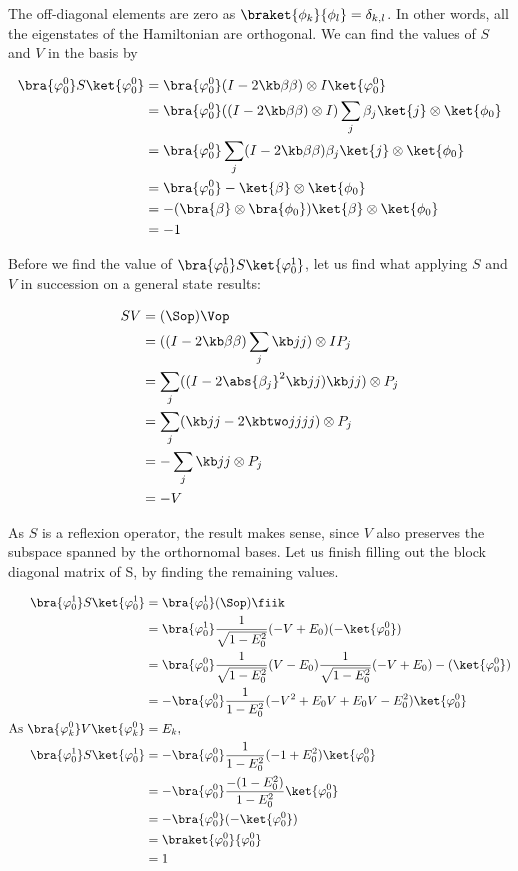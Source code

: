 The off-diagonal elements are zero as $ \braket{\phi_k}{\phi_l} = \delta_{k,l}$. In other words, all the eigenstates of the Hamiltonian are orthogonal. We can find the values of $S$ and  $V$ in the basis by

\begin{align*}
\bra{\varphi_0^0}S\ket{\varphi_0^0} &= \bra{\varphi_0^0} (I-2\kb \beta \beta) \otimes I \ket{\varphi_0^0}\\
&= \bra{\varphi^0_0} ((I-2\kb \beta \beta) \otimes I) \sum_j\beta_j\ket{j }\otimes \ket{\phi_0} \\
&= \bra{\varphi^0_0} \sum_j (I-2\kb \beta \beta) \beta_j\ket{j} \otimes \ket{\phi_0}\\
&= \bra{\varphi^0_0} - \ket{\beta} \otimes \ket{\phi_0}\\
&= - (\bra{\beta} \otimes \bra{\phi_0})  \ket{\beta} \otimes \ket{\phi_0}\\
&= -1
\end{align*}



Before we find the value of $\bra{\varphi_0^1}S\ket{\varphi_0^1}$, let us find what applying $S$ and $V$ in succession on a general state results:

\begin{align*}
SV&= (\Sop) \Vop\\
&= ((I - 2\kb \beta \beta)\sum_j \kb j j) \otimes I P_j\\
&= \sum_j ((I - 2 \abs{\beta_j}^2 \kb j j) \kb j j) \otimes P_j\\
&= \sum_j (\kb j j - 2 \kbtwo j j j j)\otimes P_j\\
&= - \sum_j \kb jj \otimes P_j\\
&= - V
\end{align*}

As $S$ is a reflexion operator, the result makes sense, since $V$ also preserves the subspace spanned by the orthornomal bases. Let us finish filling out the block diagonal matrix of S, by finding the remaining values.

\begin{align*}
\bra{\varphi_0^1}S\ket{\varphi_0^1} &= \bra{\varphi_0^1} (\Sop) \fiik \\
&= \bra{\varphi_0^1} \frac{1}{\sqrt{1 - E^2_0}} (-V + E_0) (-\ket{\varphi_0^0})\\
&= \bra{\varphi_0^0} \frac{1}{\sqrt{1 - E^2_0}} (V - E_0) \frac{1}{\sqrt{1 - E^2_0}} (-V + E_0) -(\ket{\varphi_0^0})\\
&= - \bra{\varphi_0^0} \frac{1}{1 - E^2_0} (- V^2 +E_0V+E_0V- E_0^2) \ket{\varphi_0^0}\\
\text{As } \bra{\varphi_k^0} V \ket{\varphi_k^0} &= E_k,\\
\bra{\varphi_0^1}S\ket{\varphi_0^1} &= - \bra{\varphi_0^0} \frac{1}{1 - E^2_0} (-1+E_0^2) \ket{\varphi_0^0}\\
&= - \bra{\varphi_0^0} \frac{-(1-E_0^2)}{1 - E^2_0} \ket{\varphi_0^0}\\
&= - \bra{\varphi_0^0} (- \ket{\varphi_0^0})\\
&= \braket{\varphi_0^0}{\varphi_0^0}\\
&= 1\\
\end{align*}


